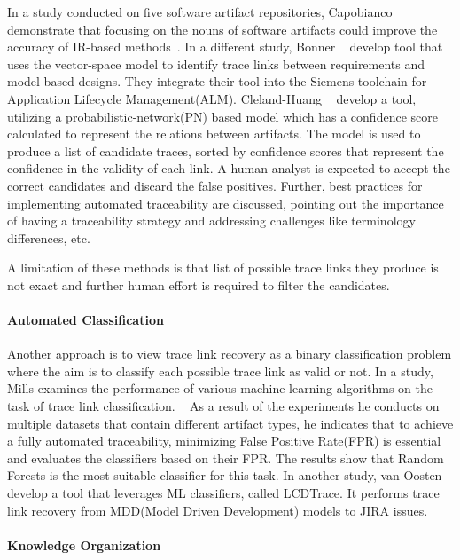 In a study conducted on five software artifact repositories, Capobianco \etal{} demonstrate that focusing on the nouns of software artifacts could improve the accuracy of IR-based methods~\cite{capobianco-2013}.
In a different study, Bonner \etal{} ~\cite{bonner-2023} develop tool that uses the vector-space model to identify trace links between requirements and model-based designs. They  integrate their tool into the Siemens toolchain for Application Lifecycle Management(ALM).
Cleland-Huang \etal{} ~\cite{cleland-huang-2007} develop a tool, utilizing a probabilistic-network(PN) based model which has a confidence score calculated to represent the relations between artifacts. The model is used to produce a list of candidate traces, sorted by confidence scores that represent the confidence in the validity of each link. A human analyst is expected to accept the correct candidates and discard the false positives. Further, best practices for implementing automated traceability are discussed, pointing out the importance of having a traceability strategy and addressing challenges like terminology differences, etc.

A limitation of these methods is that list of possible trace links they produce is not exact and further human effort is required to filter the candidates.

\paragraph{Automated Classification}

Another approach is to view trace link recovery as a binary classification problem where the aim is to classify each possible trace link as valid or not. In a study, Mills examines the performance of various machine learning algorithms on the task of trace link classification. ~\cite{mills-2017} As a result of the experiments he conducts on multiple datasets that contain different artifact types, he indicates that to achieve a fully automated traceability, minimizing False Positive Rate(FPR) is essential and evaluates the classifiers based on their FPR. The results show that Random Forests is the most suitable classifier for this task.
In another study, van Oosten \etal{} ~\cite{VANOOSTEN2023107226} develop a tool that leverages ML classifiers, called LCDTrace. It performs trace link recovery from MDD(Model Driven Development) models to JIRA issues.

\paragraph{Knowledge Organization}

